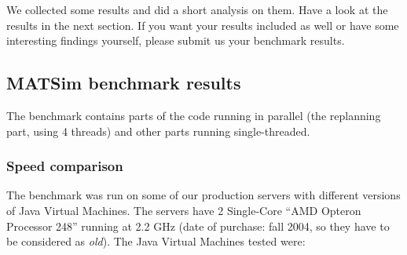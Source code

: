 We collected some results and did a short analysis on them. Have a look at the results in the next section. If you want your results included as well or have some interesting findings yourself, please submit us your benchmark results.

\subsection{MATSim benchmark results}
The benchmark contains parts of the code running in parallel (the replanning part, using 4 threads) and other parts running single-threaded.

\subsubsection{Speed comparison}
The benchmark was run on some of our production servers with different versions of Java Virtual Machines. The servers have 2 Single-Core ``AMD Opteron Processor 248'' running at 2.2 GHz (date of purchase: fall 2004, so they have to be considered as \emph{old}). The Java Virtual Machines tested were:

